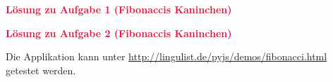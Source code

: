 \documentclass[xetex,svgnames]{scrartcl}
\begin{document}
\begin{center}
    {\bf \huge  \textcolor{Crimson}{Lösung zu Aufgabe 1 (Fibonaccis Kaninchen)} }
\end{center}


\begin{center}
  {\bf \huge \textcolor{Crimson}{Lösung zu Aufgabe 2 (Fibonaccis Kaninchen)}}
\end{center}
\lstset{language=html}


Die Applikation kann unter \url{http://lingulist.de/pyjs/demos/fibonacci.html} getestet werden.
\end{document}
